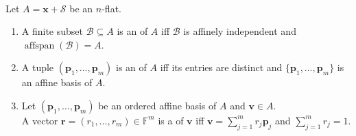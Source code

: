 \begin{definition} \label{def:affine-basis-barycentric-coordinates} \\
Let $A=\mathbf{x}+\mathcal{S}$ be an $n$-flat.
\begin{enumerate}[label=(\roman*)]
\setlength{\itemsep}{0pt}
\item A finite subset $\mathcal{B}\subseteq A$ is an  of $A$ iff $\mathcal{B}$ is affinely independent and $\operatorname{affspan}(\mathcal{B})=A$.
\item A tuple $(\mathbf{p}_1,\ldots,\mathbf{p}_m)$ is an  of $A$ iff its entries are distinct and $\{\mathbf{p}_1,\ldots,\mathbf{p}_m\}$ is an affine basis of $A$.
\item Let $(\mathbf{p}_1,\ldots,\mathbf{p}_m)$ be an ordered affine basis of $A$ and $\mathbf{v}\in A$.\\
A vector $\mathbf{r}=(r_1,\ldots,r_m)\in\mathbb{F}^m$ is a  of $\mathbf{v}$ iff $\mathbf{v}=\sum\limits_{j=1}^{m}r_j\mathbf{p}_j$ and $\sum\limits_{j=1}^{m}r_j=1$.
\end{enumerate}
\end{definition}

